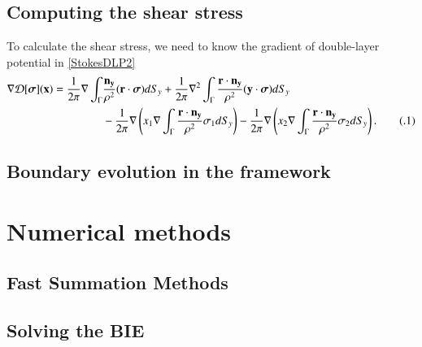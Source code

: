 \documentclass[preprint, 10pt]{elsarticle}
\newcommand{\D}{\mbox{${\mathcal D}$}}
\newcommand\numberthis{\addtocounter{equation}{1}\tag{\theequation}}
\begin{document}
 
\subsection{Computing the shear stress}
\label{sec:shearStressLP}

To calculate the shear stress, we need to know the gradient of double-layer potential in \eqref{StokesDLP2} 
\begin{align*}\label{SSLP}
\nabla\D[\boldsymbol\sigma]({\bf x})=\frac{1}{2\pi}\nabla\int_{\Gamma}&\frac{{\bf n_y}}{\rho^2}({\bf r} \cdot {\boldsymbol \sigma})dS_y+\frac{1}{2\pi}\nabla^2\int_{\Gamma}\frac{{\bf r} \cdot {\bf n_y}}{\rho^2}({\bf y} \cdot{\boldsymbol \sigma})dS_y\\
&-\frac{1}{2\pi}\nabla\left(x_1 \nabla\int_{\Gamma}\frac{{\bf r} \cdot {\bf n_y}}{\rho^2}\sigma_1dS_y\right)-\frac{1}{2\pi}\nabla\left(x_2\nabla\int_{\Gamma}\frac{{\bf r} \cdot {\bf n_y}}{\rho^2}\sigma_2dS_y\right). \numberthis
\end{align*}




\subsection{Boundary evolution in the {\thL} framework} 
\label{sec:thetaL}


\section{Numerical methods}
\label{s:method}

\subsection{Fast Summation Methods}
\label{sec:FMM}

\subsection{Solving the BIE}
\label{sec:BIE}
\end{document}
